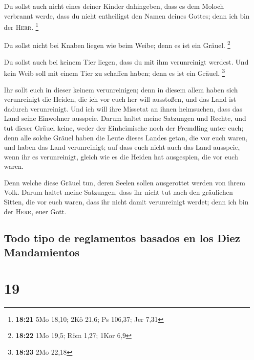  Du sollst auch nicht eines deiner Kinder dahingeben,
dass es dem Moloch verbrannt werde, dass du nicht entheiligst den Namen
deines Gottes; denn ich bin der \textsc{Herr}. \footnote{\textbf{18:21}
  5Mo 18,10; 2Kö 21,6; Ps 106,37; Jer 7,31}

 Du sollst nicht bei Knaben liegen wie beim Weibe; denn
es ist ein Gräuel. \footnote{\textbf{18:22} 1Mo 19,5; Röm 1,27; 1Kor 6,9}

 Du sollst auch bei keinem Tier liegen, dass du mit ihm
verunreinigt werdest. Und kein Weib soll mit einem Tier zu schaffen
haben; denn es ist ein Gräuel. \footnote{\textbf{18:23} 2Mo 22,18}

 Ihr sollt euch in dieser keinem verunreinigen; denn in
diesem allem haben sich verunreinigt die Heiden, die ich vor euch her
will ausstoßen,  und das Land ist dadurch verunreinigt.
Und ich will ihre Missetat an ihnen heimsuchen, dass das Land seine
Einwohner ausspeie.  Darum haltet meine Satzungen und
Rechte, und tut dieser Gräuel keine, weder der Einheimische noch der
Fremdling unter euch;  denn alle solche Gräuel haben die
Leute dieses Landes getan, die vor euch waren, und haben das Land
verunreinigt;  auf dass euch nicht auch das Land
ausspeie, wenn ihr es verunreinigt, gleich wie es die Heiden hat
ausgespien, die vor euch waren.

 Denn welche diese Gräuel tun, deren Seelen sollen
ausgerottet werden von ihrem Volk.  Darum haltet meine
Satzungen, dass ihr nicht tut nach den gräulichen Sitten, die vor euch
waren, dass ihr nicht damit verunreinigt werdet; denn ich bin der
\textsc{Herr}, euer Gott.

\hypertarget{todo-tipo-de-reglamentos-basados-en-los-diez-mandamientos}{%
\subsection{Todo tipo de reglamentos basados \hspace{0pt}\hspace{0pt}en
los Diez
Mandamientos}\label{todo-tipo-de-reglamentos-basados-en-los-diez-mandamientos}}

\hypertarget{section-18}{%
\section{19}\label{section-18}}

